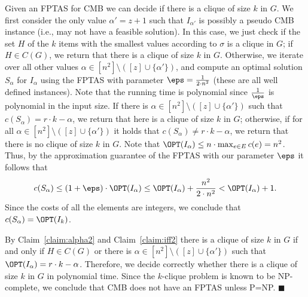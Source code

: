 {	Given an FPTAS for CMB we can decide if there is a clique of size $k$ in $G$. We first consider the only value $\alpha' = z+1$ such that $I_{\alpha'}$ is possibly a pseudo CMB instance (i.e., may not have a feasible solution). In this case, we just check if the set $H$ of the $k$ items with the smallest values according to $\sigma$ is a clique in $G$; if $H \in C(G)$, we return that there is a clique of size $k$ in $G$. Otherwise, we iterate over all other values $\alpha \in  [n^2] \setminus ([z] \cup \{\alpha'\})$, and compute an optimal solution $S_{\alpha}$ for $I_{\alpha}$ using the FPTAS with parameter $\eps = \frac{1}{2 \cdot n^2}$ (these are all well defined instances). Note that the running time is polynomial since $\frac{1}{\eps}$ is polynomial in the input size. If there is $\alpha \in  [n^2] \setminus ([z] \cup \{\alpha'\})$ such that $c(S_{\alpha}) = r \cdot k-\alpha$, we return that here is a clique of size $k$ in $G$; otherwise, if for all $\alpha \in  [n^2]\setminus ([z] \cup \{\alpha'\})$  it holds that  $c(S_{\alpha}) \neq r \cdot k-\alpha$, we return that there is no clique of size $k$ in $G$. Note that $\OPT(I_{\alpha}) \leq n \cdot \max_{e \in E} c(e) = n^2$. Thus, 
	by the approximation guarantee of the FPTAS with our parameter $\eps$ it follows that $$c(S_{\alpha}) \leq (1+\eps) \cdot \OPT(I_{\alpha}) \leq \OPT(I_{\alpha}) + \frac{n^2}{2 \cdot n^2} < \OPT(I_{\alpha})+1.$$ Since the costs of all the elements are integers, we conclude that $c(S_{\alpha}) = \OPT(I_k)$. %
	
	By Claim~\ref{claim:alpha2} and Claim~\ref{claim:iff2} there is a clique of size $k$ in $G$ if and only if $H \in C(G)$ or there is $\alpha \in [n^2] \setminus ([z] \cup \{\alpha'\})$ such that $\OPT(I_{\alpha}) = r \cdot k-\alpha$. Therefore, we decide correctly whether there is a clique of size $k$ in $G$ in polynomial time. Since the $k$-clique problem is known to be NP-complete, we conclude that CMB does not have an FPTAS unless P=NP.
	$\blacksquare$
	
	
	
}







